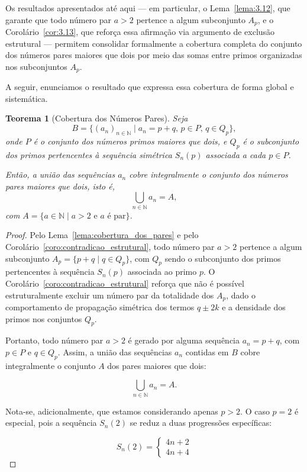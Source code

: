 \documentclass[a4paper,11pt]{article}
\newtheorem{theorem}{Teorema}[section]
\theoremstyle{definition}
\theoremstyle{remark}
\begin{document}
\begin{otherlanguage}{brazil}
	Os resultados apresentados até aqui — em particular, o Lema~\ref{lema:3.12}, que garante que todo número par \( a > 2 \) pertence a algum subconjunto \( A_p \), e o Corolário~\ref{cor:3.13}, que reforça essa afirmação via argumento de exclusão estrutural — permitem consolidar formalmente a cobertura completa do conjunto dos números pares maiores que dois por meio das somas entre primos organizadas nos subconjuntos \( A_p \).
	
	A seguir, enunciamos o resultado que expressa essa cobertura de forma global e sistemática.
	
	\begin{theorem}[Cobertura dos Números Pares]\label{teo:cobertura_dos_pares}
		Seja
		\[
		B = \{(a_n)_{n \in \mathbb{N}} \mid a_n = p + q,\, p \in P,\, q \in Q_p\},
		\]
		onde \(P\) é o conjunto dos números primos maiores que dois, e \(Q_p\) é o subconjunto dos primos pertencentes à sequência simétrica \(S_n(p)\) associada a cada \(p \in P\).
		
		Então, a união das sequências \(a_n\) cobre integralmente o conjunto dos números pares maiores que dois, isto é,
		\[
		\bigcup_{n \in \mathbb{N}} a_n = A,
		\]
		com \(A = \{a \in \mathbb{N} \mid a > 2 \text{ e } a \text{ é par} \}\).
	\end{theorem}
	\begin{proof}
		Pelo Lema~\ref{lema:cobertura_dos_pares} e pelo Corolário~\ref{coro:contradicao_estrutural}, todo número par \(a > 2\) pertence a algum subconjunto \(A_p = \{p + q \mid q \in Q_p\}\), com \(Q_p\) sendo o subconjunto dos primos pertencentes à sequência \(S_n(p)\) associada ao primo \(p\). O Corolário~\ref{coro:contradicao_estrutural} reforça que não é possível estruturalmente excluir um número par da totalidade dos \(A_p\), dado o comportamento de propagação simétrica dos termos \(q \pm 2k\) e a densidade dos primos nos conjuntos \(Q_p\).
		
		Portanto, todo número par \(a > 2\) é gerado por alguma sequência \(a_n = p + q\), com \(p \in P\) e \(q \in Q_p\). Assim, a união das sequências \(a_n\) contidas em \(B\) cobre integralmente o conjunto \(A\) dos pares maiores que dois:
		
		\[
		\bigcup_{n \in \mathbb{N}} a_n = A.
		\]
		
			Nota-se, adicionalmente, que estamos considerando apenas \(p > 2\). O caso \(p = 2\) é especial, pois a sequência \(S_n(2)\) se reduz a duas progressões específicas:
		
		\[
		S_n(2) =
		\begin{cases}
			4n + 2 \\
			4n + 4
		\end{cases}
		\]
		

\end{proof}
\end{otherlanguage}
\end{document}
